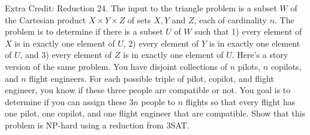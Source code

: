 \documentclass[10pt]{article}
\begin{document}
\newpage
Extra Credit: Reduction 24. The input to the triangle problem is a subset $W$ of the Cartesian product $X \times Y \times Z$ of sets $X, Y$
and $Z$, each of cardinality $n$. The problem is to determine if there is a subset $U$ of $W$ such that 1)
every element of $X$ is in exactly one element of $U$, 2) every element of $Y$ is in exactly one element
of $U$, and 3) every element of $Z$ is in exactly one element of $U$. Here's a story version of the same
problem. You have disjoint collections of $n$ pilots, $n$ copilots, and $n$ flight engineers. For each possible
triple of pilot, copilot, and flight engineer, you know if these three people are compatible or not. You
goal is to determine if you can assign these $3n$ people to $n$ flights so that every flight has one pilot,
one copilot, and one flight engineer that are compatible. Show that this problem is NP-hard using a
reduction from 3SAT.
\end{document}
